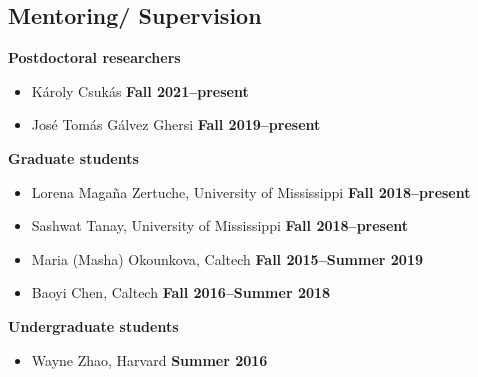\documentclass[margin,line]{res}
\begin{document}
\begin{resume}
\section{\sc Mentoring/
  Supervision}
{\bf Postdoctoral researchers}
\begin{itemize}
\item[] Károly Csukás
\hfill {\bf Fall 2021--present}
\item[] José Tomás Gálvez Ghersi
\hfill {\bf Fall 2019--present}
\end{itemize}
{\bf Graduate students}
\begin{itemize}
\item[] Lorena Magaña Zertuche, University of Mississippi
\hfill {\bf Fall 2018--present}
\item[] Sashwat Tanay, University of Mississippi
\hfill {\bf Fall 2018--present}
\item[] Maria (Masha) Okounkova, Caltech
\hfill {\bf Fall 2015--Summer 2019}
\item[] Baoyi Chen, Caltech
\hfill {\bf Fall 2016--Summer 2018}
\end{itemize}
{\bf Undergraduate students}
\begin{itemize}
\item[] Wayne Zhao, Harvard
\hfill {\bf Summer 2016}
\end{itemize}


\end{resume}
\end{document}
